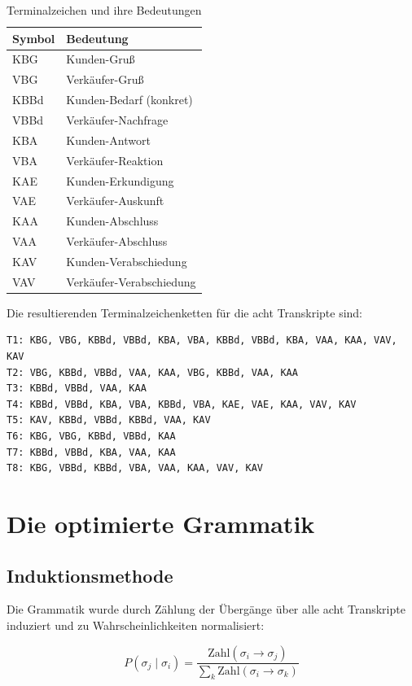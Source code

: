 \documentclass[12pt,a4paper]{article}
\begin{document}
\begin{table}[H]
\centering
\caption{Terminalzeichen und ihre Bedeutungen}
\label{tab:terminals}
\begin{tabular}{@{} l l @{}}
\toprule
\textbf{Symbol} & \textbf{Bedeutung} \\
\midrule
KBG & Kunden-Gruß \\
VBG & Verkäufer-Gruß \\
KBBd & Kunden-Bedarf (konkret) \\
VBBd & Verkäufer-Nachfrage \\
KBA & Kunden-Antwort \\
VBA & Verkäufer-Reaktion \\
KAE & Kunden-Erkundigung \\
VAE & Verkäufer-Auskunft \\
KAA & Kunden-Abschluss \\
VAA & Verkäufer-Abschluss \\
KAV & Kunden-Verabschiedung \\
VAV & Verkäufer-Verabschiedung \\
\bottomrule
\end{tabular}
\end{table}

Die resultierenden Terminalzeichenketten für die acht Transkripte sind:

\begin{verbatim}
T1: KBG, VBG, KBBd, VBBd, KBA, VBA, KBBd, VBBd, KBA, VAA, KAA, VAV, KAV
T2: VBG, KBBd, VBBd, VAA, KAA, VBG, KBBd, VAA, KAA
T3: KBBd, VBBd, VAA, KAA
T4: KBBd, VBBd, KBA, VBA, KBBd, VBA, KAE, VAE, KAA, VAV, KAV
T5: KAV, KBBd, VBBd, KBBd, VAA, KAV
T6: KBG, VBG, KBBd, VBBd, KAA
T7: KBBd, VBBd, KBA, VAA, KAA
T8: KBG, VBBd, KBBd, VBA, VAA, KAA, VAV, KAV
\end{verbatim}

\section{Die optimierte Grammatik}

\subsection{Induktionsmethode}

Die Grammatik wurde durch Zählung der Übergänge über alle acht Transkripte
induziert und zu Wahrscheinlichkeiten normalisiert:

\[
P(\sigma_j \mid \sigma_i) = \frac{\text{Zahl}(\sigma_i \to \sigma_j)}{\sum_k \text{Zahl}(\sigma_i \to \sigma_k)}
\]
\end{document}
